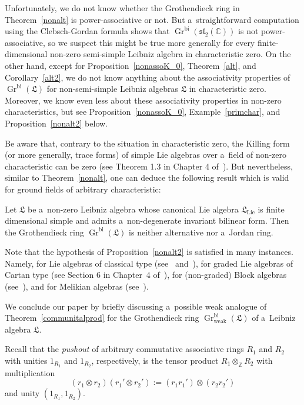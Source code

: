 \documentclass{jonasart}
\DeclareMathOperator{\bi}{bi}
\DeclareMathOperator{\K}{Gr}
\DeclareMathOperator{\lie}{Lie}
\DeclareMathOperator{\weak}{weak}
\newcommand{\cbb}{\mathbb{C}}
\newcommand{\lf}{\mathfrak{L}}
\newcommand{\slf}{\mathfrak{sl}}
\newcommand{\zbb}{\mathbb{Z}}
\begin{document}
	\begin{remark}
		{Unfortunately, we do not know whether the Grothendieck ring in
		Theorem~\ref{nonalt} is power-associative or not. But a~straightforward computation using the Clebsch-Gordan formula shows that $\K^{\bi} (\slf_2
		(\cbb))$ is not power-associative, so we suspect this might be true more generally for every finite-dimensional non-zero semi-simple Leibniz algebra in characteristic zero. On the other hand, except for Proposition~\ref{nonassoK_0},
		Theorem~\ref{alt}, and Corollary~\ref{alt2}, we do not know anything about the associativity properties of $\K^{\bi}(\lf)$ for non-semi-simple
		Leibniz algebras $\lf$ in characteristic zero. Moreover, we know even less about these associativity properties in non-zero characteristics, but see Proposition~\ref{nonassoK_0}, Example~\ref{primchar}, and
		Proposition~\ref{nonalt2} below.}
	\end{remark}
	Be aware that, contrary to the situation in characteristic zero, the Killing form (or more generally, trace forms) of simple Lie algebras over a~field of non-zero characteristic can be zero (see Theorem 1.3 in Chapter 4 of~\cite{SF}). But nevertheless, similar to Theorem~\ref{nonalt}, one can deduce the following result which is valid for ground fields of arbitrary characteristic:
	\begin{proposition}\label{nonalt2}
		Let $\lf$ be a~non-zero Leibniz algebra whose canonical Lie algebra
		$\lf_{\lie}$ is finite dimensional simple and admits a~non-degenerate invariant bilinear form. Then the Grothendieck ring $\K^{\bi}(\lf)$ is neither alternative nor a~Jordan ring.
	\end{proposition}

	\begin{remark}
		{Note that the hypothesis of Proposition~\ref{nonalt2} is satisfied in many instances. Namely, for Lie algebras of classical type (see~\cite[Corollary 6.1]{B2} and~\cite[Theorems A and B]{G}), for graded Lie algebras of Cartan type (see Section 6 in Chapter~4 of~\cite{SF}), for (non-graded) Block algebras (see~\cite[Theorem 7]{B1}), and for Melikian algebras (see~\cite[Proposition~6.1]{PS}).}
	\end{remark}
	We conclude our paper by briefly discussing a~possible weak analogue of
	Theorem~\ref{communitalprod} for the Grothendieck ring $\K_{\weak}^{\bi}
	(\lf)$ of a~Leibniz algebra $\lf$.

	Recall that the \emph{pushout\/} of arbitrary commutative associative rings $R_1$ and $R_2$ with unities $1_{R_1}$ and $1_{R_2}$, respectively, is the tensor product $R_1\otimes_\zbb R_2$ with multiplication
	\[
		(r_1\otimes r_2 )(r_1 '\otimes r_2 '):=(r_1 r _1 ')\otimes(r_2 r_2 ')
	\]
	and unity $(1_{R_1},1_{R_2})$.
\end{document}
